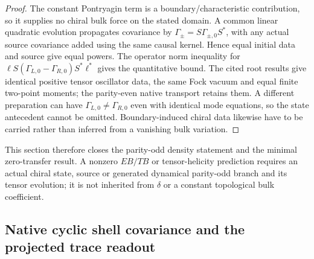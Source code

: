 \documentclass[12pt,a4paper]{article}
\begin{document}
\begin{proof}
The constant Pontryagin term is a boundary/characteristic contribution,
so it supplies no chiral bulk force on the stated domain. A common
linear quadratic evolution propagates covariance by
$\Gamma_{\pm}=S\Gamma_{\pm,0}S^*$, with any actual source covariance
added using the same causal kernel. Hence equal initial data and source
give equal powers. The operator norm inequality for
$\ell S(\Gamma_{L,0}-\Gamma_{R,0})S^*\ell^*$ gives the quantitative
bound. The cited root results give identical positive tensor oscillator
data, the same Fock vacuum and equal finite two-point moments; the
parity-even native transport retains them. A different preparation can
have $\Gamma_{L,0}\ne\Gamma_{R,0}$ even with identical mode equations,
so the state antecedent cannot be omitted. Boundary-induced chiral data
likewise have to be carried rather than inferred from a vanishing bulk
variation.
\end{proof}

This section therefore closes the parity-odd density statement and the minimal zero-transfer result.  A nonzero $EB/TB$ or tensor-helicity prediction requires an actual chiral state, source or generated dynamical parity-odd branch and its tensor evolution; it is not inherited from $\delta$ or a constant topological bulk coefficient.

\subsection{Native cyclic shell covariance and the projected trace readout}
\label{p8:sec:native-cyclic-shell-covariance}
\end{document}
